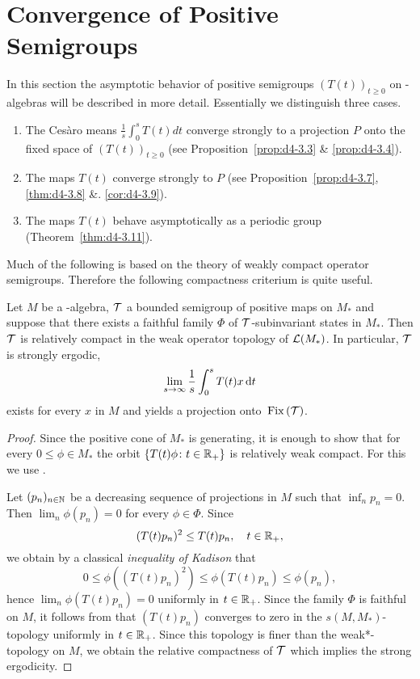 \section{Convergence of Positive Semigroups}\label{sec:d4-3}
In this section the asymptotic behavior of positive semigroups $(T(t))_{t \geq 0}$ on \WA-algebras will be described in more detail.
Essentially we distinguish three cases.
\begin{enumerate}[\upshape (i), wide, labelindent=.5em]
\item
The Cesàro means $\frac{1}{s}\int_{0}^{s} T(t)dt$ converge strongly to a projection $P$ onto the fixed space of $(T(t))_{t \geq 0}$ (see Proposition~\ref{prop:d4-3.3} \& \ref{prop:d4-3.4}).

\item
The maps $T(t)$ converge strongly to $P$ (see Proposition~\ref{prop:d4-3.7}, \ref{thm:d4-3.8} \&. \ref{cor:d4-3.9}).

\item
The maps $T(t)$ behave asymptotically as a periodic group (Theorem~\ref{thm:d4-3.11}).
\end{enumerate}
Much of the following is based on the theory of weakly compact operator semigroups.
Therefore the following compactness criterium is quite useful.
\begin{proposition}\label{prop:d4-3.1}
Let $M$ be a \WA-algebra, $\mathcal{T}$ a bounded semigroup of positive maps on $M_{*}$ and suppose that there exists a faithful family $\Phi$ of\/ $\mathcal{T}$-subinvariant states in $M_{*}$.
Then $\mathcal{T}$ is relatively compact in the weak operator topology of $ \mathcal{L}(M_{*}) $.
In particular, $\mathcal{T}$ is strongly ergodic, \ie 
%
\[
	\lim_{s \to \infty} \frac{1}{s}\int_{0}^{s} T(t)x \mathop{}\!\mathrm{d}{t}
\]
%
exists for every $x$ in $M$ and yields a projection onto $\mathop{}\mathrm{Fix}\left(\mathcal{T}\right)$.
\end{proposition}
%
\begin{proof}
Since the positive cone of $M_{*}$ is generating, it is enough to show that for every $0 \leq \phi \in M_{*}$ the orbit $\{T(t)\phi \colon t \in \mathbb{R}_{+}\}$ is relatively weak compact.
For this we use \citet[Theorem III.5.4.(iii)]{takesaki:1979}.

Let $(p_{n})_{n \in \mathbb{N}}$ be a decreasing sequence of projections in $M$ such that $\inf_{n} p_{n} = 0$.
Then $\lim_{n}\phi(p_{n}) = 0$ for every $\phi \in \Phi$.
Since
\[
	(T(t)p_{n})^2 \leq T(t)p_{n}, \quad t \in \mathbb{R}_{+},
\]
we obtain by a classical \emph{inequality of Kadison} that
\[
0 \leq \phi((T(t)p_{n})^2) \leq \phi(T(t)p_{n}) \leq \phi(p_{n}),
\]
hence $\lim_{n}\phi(T(t)p_{n}) = 0$ uniformly in $t \in \mathbb{R}_{+}$.
Since the family $\Phi$ is faithful on $M$, it follows from \citet[Proposition III.5.3]{takesaki:1979} that $(T(t)p_{n})$ converges to zero in the $s(M,M_{*})$-topology uniformly in $t \in \mathbb{R}_{+}$.
Since this topology is finer than the weak*-topology on $M$, we obtain the relative compactness of\/ $\mathcal{T}$ which implies the strong ergodicity.
\end{proof}
